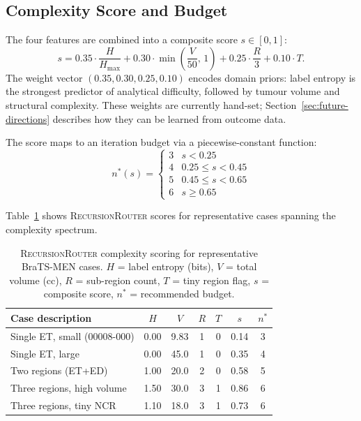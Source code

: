 \documentclass{article}
\newcommand{\RRouter}{\textsc{RecursionRouter}}
\begin{document}
	\subsection{Complexity Score and Budget}
	
	The four features are combined into a composite score $s \in [0,1]$:
	\begin{equation}
		s = 0.35 \cdot \frac{H}{H_{\max}}
		+ 0.30 \cdot \min\!\left(\frac{V}{50},\, 1\right)
		+ 0.25 \cdot \frac{R}{3}
		+ 0.10 \cdot T.
		\label{eq:score}
	\end{equation}
	The weight vector $(0.35, 0.30, 0.25, 0.10)$ encodes domain priors: label
	entropy is the strongest predictor of analytical difficulty, followed by
	tumour volume and structural complexity.
	These weights are currently hand-set; Section~\ref{sec:future-directions}
	describes how they can be learned from outcome data.
	
	The score maps to an iteration budget via a piecewise-constant function:
	\begin{equation}
		n^*(s) = \begin{cases}
			3 & s < 0.25 \\
			4 & 0.25 \le s < 0.45 \\
			5 & 0.45 \le s < 0.65 \\
			6 & s \ge 0.65
		\end{cases}
		\label{eq:budget}
	\end{equation}
	
	Table~\ref{tab:router} shows \RRouter{} scores for representative cases
	spanning the complexity spectrum.
	
	\begin{table}[h]
		\centering
		\caption{\RRouter{} complexity scoring for representative BraTS-MEN
			cases. $H$ = label entropy (bits), $V$ = total volume (cc),
			$R$ = sub-region count, $T$ = tiny region flag,
			$s$ = composite score, $n^*$ = recommended budget.}
		\label{tab:router}
		\small
		\begin{tabular}{lcccccc}
			\toprule
			Case description & $H$ & $V$ & $R$ & $T$ & $s$ & $n^*$ \\
			\midrule
			Single ET, small (00008-000) & 0.00 & 9.83  & 1 & 0 & 0.14 & 3 \\
			Single ET, large             & 0.00 & 45.0  & 1 & 0 & 0.35 & 4 \\
			Two regions (ET+ED)          & 1.00 & 20.0  & 2 & 0 & 0.58 & 5 \\
			Three regions, high volume   & 1.50 & 30.0  & 3 & 1 & 0.86 & 6 \\
			Three regions, tiny NCR      & 1.10 & 18.0  & 3 & 1 & 0.73 & 6 \\
			\bottomrule
		\end{tabular}
	\end{table}
	
\end{document}
